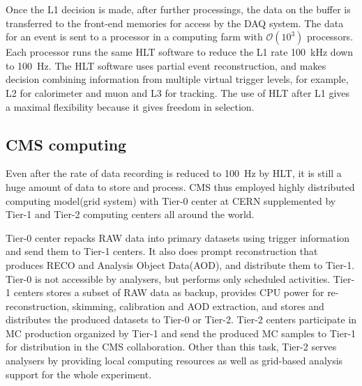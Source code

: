 Once the L1 decision is made, after further processings, 
the data on the buffer is transferred to the front-end memories for access 
by the DAQ system. The data for an event is sent to a processor 
in a computing farm with $\mathcal{O}(10^3)$ processors. 
Each processor runs the same HLT software to reduce the L1 rate 100~kHz 
down to 100~Hz. The HLT software uses partial event reconstruction, 
and makes decision combining information from multiple virtual trigger 
levels, for example, L2 for calorimeter and muon and L3 for tracking. 
The use of HLT after L1 gives a maximal flexibility because 
it gives freedom in selection. 



\subsection{CMS computing}  

Even after the rate of data recording is reduced to 100~Hz by HLT, 
it is still a huge amount of data to store and process. CMS thus employed 
highly distributed computing model(grid system) with Tier-0 center at CERN supplemented 
by Tier-1 and Tier-2 computing centers all around the world. 

Tier-0 center repacks RAW data into primary datasets using trigger information
and send them to Tier-1 centers. It also does prompt reconstruction 
that produces RECO and Analysis Object Data(AOD),
and distribute them to Tier-1. Tier-0 is not accessible by analysers, but  
performs only scheduled activities. 
Tier-1 centers stores a subset of RAW data as backup, provides CPU power for 
re-reconstruction, skimming, calibration and AOD extraction, and 
stores and distributes the produced datasets to Tier-0 or Tier-2. 
Tier-2 centers participate in MC production organized by Tier-1 and 
send the produced MC samples to Tier-1 for distribution in the CMS collaboration. 
Other than this task, Tier-2 serves analysers by providing local computing 
resources as well as grid-based analysis support for the whole experiment.  
